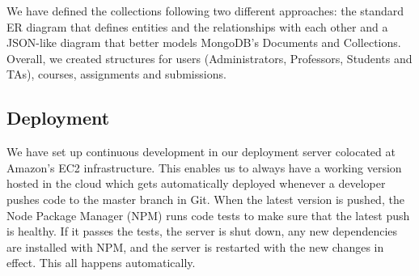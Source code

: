 We have defined the collections following two different approaches: the
standard ER diagram that defines entities and the relationships with each other
and a JSON-like diagram that better models MongoDB's Documents and Collections.
Overall, we created structures for users (Administrators, Professors, Students
and TAs), courses, assignments and submissions.


\subsection{Deployment}

We have set up continuous development in our deployment server colocated at
Amazon's EC2 infrastructure. This enables us to always have a working version
hosted in the cloud which gets automatically deployed whenever a developer
pushes code to the master branch in Git. When the latest version is pushed, the
Node Package Manager (NPM) runs code tests to make sure that the latest push is
healthy. If it passes the tests, the server is shut down, any new dependencies
are installed with NPM, and the server is restarted with the new changes in
effect. This all happens automatically.







